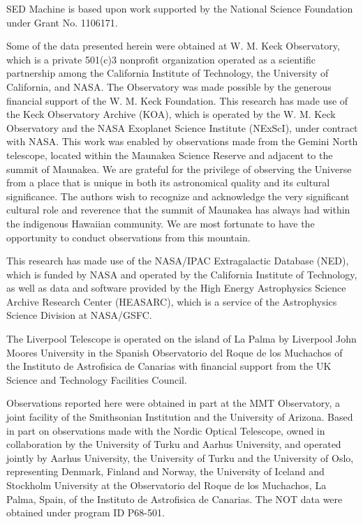 \documentclass[twocolumn,twocolappendix, linenumbers, trackchanges]{aastex7}
\begin{document}
SED Machine is based upon work supported by the National Science Foundation under Grant No.
1106171.

Some of the data presented herein were obtained at W. M. Keck Observatory, which is a private 501(c)3 nonprofit organization operated as a scientific partnership among the California Institute of Technology, the University of California, and NASA. 
The Observatory was made possible by the generous financial support of the W. M. Keck Foundation.
This research has made use of the Keck Observatory Archive (KOA), which is operated by the W. M. Keck Observatory and the NASA Exoplanet Science Institute (NExScI), under contract with NASA.
This work was enabled by observations made from the Gemini North telescope, located within the Maunakea Science Reserve and adjacent to the summit of Maunakea. We are grateful for the privilege of observing the Universe from a place that is unique in both its astronomical quality and its cultural significance.  The authors wish to recognize and acknowledge the very significant cultural role and reverence that the summit of Maunakea has always had within the indigenous Hawaiian community. We are most fortunate to have the opportunity to conduct observations from this mountain.

This research has made use of the NASA/IPAC Extragalactic Database (NED), which is funded by NASA and operated by the California Institute of Technology, as well as data and software provided by the High Energy Astrophysics Science Archive Research Center (HEASARC), which is a service of the Astrophysics Science Division at NASA/GSFC.

The Liverpool Telescope is operated on the island of La Palma by Liverpool John Moores University in the Spanish Observatorio del Roque de los Muchachos of the Instituto de Astrofisica de Canarias with financial support from the UK Science and Technology Facilities Council.

Observations reported here were obtained in part at the MMT Observatory, a joint facility of the Smithsonian Institution and the University of Arizona.
%
Based in part on observations made with the Nordic Optical Telescope, owned in collaboration by the University of Turku and Aarhus University, and operated jointly by Aarhus University, the University of Turku and the University of Oslo, representing Denmark, Finland and Norway, the University of Iceland and Stockholm University at the Observatorio del Roque de los Muchachos, La Palma, Spain, of the Instituto de Astrofisica de Canarias. The NOT data were obtained under program ID P68-501.
\end{document}

